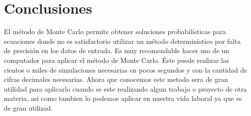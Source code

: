 \documentclass{article}
\begin{document}
\section{Conclusiones}
El método de Monte Carlo permite obtener soluciones probabilísticas para ecuaciones donde no es satisfactorio utilizar un método determinístico por falta de precisión en los datos de entrada.
Es muy recomendable hacer uso de un computador para aplicar el método de Monte Carlo. Éste puede realizar las cientos o miles de simulaciones necesarias en pocos segundos y con la cantidad de cifras decimales necesarias.
Ahora que conocemos este metodo sera de gran utilidad para aplicarlo cuando se este realizando algun trabajo o proyecto de otra materia, asi como tambien lo podemos aplicar en nuestra vida laboral ya que es de gran utilizad.




\end{document}
